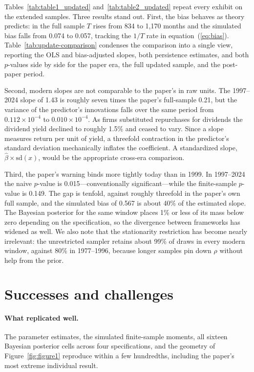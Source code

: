 \documentclass[11pt]{article}
\begin{document}
Tables~\ref{tab:table1_updated} and~\ref{tab:table2_updated} repeat every
exhibit on the extended samples. Three results stand out. First, the bias behaves as theory predicts: in the full
sample $T$ rises from 834 to 1{,}170 months and the simulated bias falls from
0.074 to 0.057, tracking the $1/T$ rate in equation~(\ref{eq:bias}).
Table~\ref{tab:update-comparison} condenses the comparison into a single view, 
reporting the OLS and bias-adjusted slopes, both persistence estimates, 
and both $p$-values side by side for the paper era, the full updated sample, and the post-paper period.

Second, modern slopes are not comparable to the paper's in raw units. The
1997--2024 slope of 1.43 is roughly seven times the paper's full-sample 0.21,
but the variance of the predictor's innovations falls over the same period from
$0.112 \times 10^{-4}$ to $0.010 \times 10^{-4}$. As firms substituted
repurchases for dividends the dividend yield declined to roughly 1.5\% and
ceased to vary. Since a slope measures return per unit of yield, a threefold
contraction in the predictor's standard deviation mechanically inflates the
coefficient. A standardized slope, $\hat\beta \times \mathrm{sd}(x)$, would be
the appropriate cross-era comparison.

Third, the paper's warning binds more tightly today than in 1999. In 1997--2024
the naive $p$-value is 0.015---conventionally significant---while the
finite-sample $p$-value is 0.149. The gap is tenfold, against roughly threefold
in the paper's own full sample, and the simulated bias of 0.567 is about 40\% of
the estimated slope. The Bayesian posterior for the same window places 1\% or 
less of its mass below zero depending on the specification, so the divergence 
between frameworks has widened as well. We also note that the stationarity restriction has become nearly
irrelevant: the unrestricted sampler retains about 99\% of draws in every modern
window, against 80\% in 1977--1996, because longer samples pin down $\rho$
without help from the prior.

\section{Successes and challenges}

\paragraph{What replicated well.} The parameter estimates, the simulated
finite-sample moments, all sixteen Bayesian posterior cells across four
specifications, and the geometry of Figure~\ref{fig:figure1} reproduce within a few hundredths,
including the paper's most extreme individual result.
\end{document}
